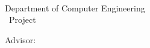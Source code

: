 
\newlength{\mylen}
\newlength{\tempp}
\setlength{\tempp}{\cftfignumwidth}

\iffigures
    \newpage
    \renewcommand{\figurename}{\figureName}
    \renewcommand{\cftfigpresnum}{\figurename\enspace}
    \renewcommand{\cftfigaftersnum}{}
    \settowidth{\mylen}{\cftfigpresnum\cftfigaftersnum}
    \addtolength{\cftfignumwidth}{\mylen}
    
    \chapter*{\listfigures}
    \renewcommand\listfigurename{\vspace{-3.2em}}
    \listoffigures
\fi

\iftables
    \newpage
    \renewcommand{\tablename}{\tableName}
    \renewcommand{\cfttabpresnum}{\tablename\enspace}
    \renewcommand{\cfttabaftersnum}{}
    \settowidth{\mylen}{\cfttabpresnum\cfttabaftersnum}
    \addtolength{\cfttabnumwidth}{\mylen}
    
    \chapter*{\listtables}
    \renewcommand\listtablename{\vspace{-3.2em}}
    
    \listoftables
\fi


\ifnum{}
\ifnum{}
\newpage
\chapter*{\eabstract}

\begin{center}
{\bfseries \Large\titleEN}

\studenti \\ \studentii

Department of Computer Engineering \\ {\degree~Project}

Advisor: \advisorEN

\end{center}

